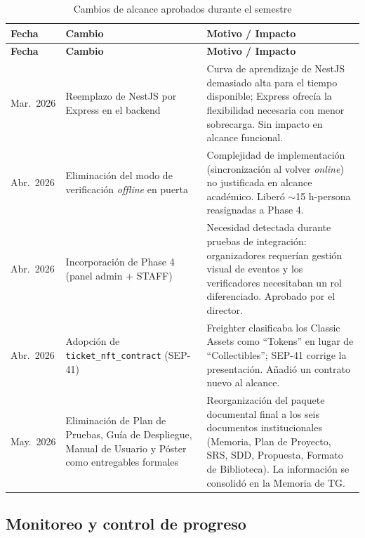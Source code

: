\documentclass[12pt,oneside]{report}
\begin{document}
      \begin{longtable}{@{}p{2.0cm} p{6.0cm} p{6.6cm}@{}}
        \caption{Cambios de alcance aprobados durante el semestre}
        \label{tab:cambios-alcance}\\
        \toprule
        \textbf{Fecha} & \textbf{Cambio} & \textbf{Motivo / Impacto}\\
        \midrule
        \endfirsthead
        \toprule
        \textbf{Fecha} & \textbf{Cambio} & \textbf{Motivo / Impacto}\\
        \midrule
        \endhead
        \bottomrule
        \endfoot
        Mar.~2026 & Reemplazo de NestJS por Express en el backend & Curva de aprendizaje de NestJS demasiado alta para el tiempo disponible; Express ofrecía la flexibilidad necesaria con menor sobrecarga. Sin impacto en alcance funcional.\\
        Abr.~2026 & Eliminación del modo de verificación \textit{offline} en puerta & Complejidad de implementación (sincronización al volver \textit{online}) no justificada en alcance académico. Liberó $\sim$15 h-persona reasignadas a Phase 4.\\
        Abr.~2026 & Incorporación de Phase 4 (panel admin + STAFF) & Necesidad detectada durante pruebas de integración: organizadores requerían gestión visual de eventos y los verificadores necesitaban un rol diferenciado. Aprobado por el director.\\
        Abr.~2026 & Adopción de \texttt{ticket\_nft\_contract} (SEP-41) & Freighter clasificaba los Classic Assets como ``Tokens'' en lugar de ``Collectibles''; SEP-41 corrige la presentación. Añadió un contrato nuevo al alcance.\\
        May.~2026 & Eliminación de Plan de Pruebas, Guía de Despliegue, Manual de Usuario y Póster como entregables formales & Reorganización del paquete documental final a los seis documentos institucionales (Memoria, Plan de Proyecto, SRS, SDD, Propuesta, Formato de Biblioteca). La información se consolidó en la Memoria de TG.\\
      \end{longtable}

    \subsection{Monitoreo y control de progreso}
    \label{subsec:monitoreo-progreso}
\end{document}
